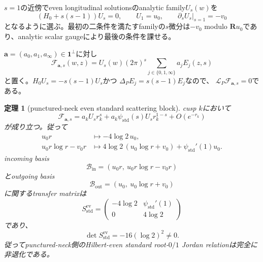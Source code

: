 \documentclass[11pt,a4paper]{ltjsarticle}
\newtheorem{theorem}{定理}[section]
\theoremstyle{definition}
\theoremstyle{remark}
\newcommand{\RR}{\mathbf R}
\newcommand{\one}{\mathbf 1}
\begin{document}
$s=1$の近傍でeven longitudinal solutionsのanalytic family$U_s(w)$を
\begin{equation}\label{eq:longitudinal-analytic-family}
 (H_0+s(s-1))U_s=0,
 \qquad
 U_1=u_0,
 \qquad
 \left.\partial_sU_s\right|_{s=1}=-v_0
\end{equation}
となるように選ぶ。最初の二条件を満たすfamilyの$s$微分は$-v_0$ modulo $\RR u_0$であり、analytic scalar gaugeにより最後の条件を課せる。

$\mathbf a=(a_0,a_1,a_\infty)\in\one^\perp$に対し
\begin{equation}\label{eq:separated-standard-family}
 \mathcal F_{\mathbf a,s}(w,z)
 =U_s(w)(2\pi)^s
  \sum_{j\in\{0,1,\infty\}}a_jE_j(z,s)
\end{equation}
と置く。$H_0U_s=-s(s-1)U_s$かつ
$\Delta_PE_j=s(s-1)E_j$なので、
$\mathscr L_P\mathcal F_{\mathbf a,s}=0$である。

\begin{theorem}[punctured-neck even standard scattering block]
\label{thm:even-standard-jordan-block}
cusp $k$において
\begin{equation}\label{eq:separated-standard-cusp-expansion}
 \mathcal F_{\mathbf a,s}
 =a_kU_s r_k^s
 +a_k\psi_{\mathrm{std}}(s)U_s r_k^{1-s}
 +O(e^{-r_k})
\end{equation}
が成り立つ。従って
\begin{align}
 u_0r&\longmapsto-4\log2\,u_0,
 \label{eq:regular-standard-transfer}\\
 u_0r\log r-v_0r
 &\longmapsto
 4\log2\,(u_0\log r+v_0)
 +\psi_{\mathrm{std}}'(1)u_0.
 \label{eq:jordan-standard-transfer}
\end{align}
incoming basis
\[
 \mathcal B_{\mathrm{in}}
 =(u_0r,\ u_0r\log r-v_0r)
\]
とoutgoing basis
\[
 \mathcal B_{\mathrm{out}}
 =(u_0,\ u_0\log r+v_0)
\]
に関するtransfer matrixは
\begin{equation}\label{eq:even-standard-transfer-matrix}
 \boxed{
 S_{\mathrm{std}}^{\mathrm{ev}}
 =\begin{pmatrix}
 -4\log2&\psi_{\mathrm{std}}'(1)\\
 0&4\log2
 \end{pmatrix}
 }
\end{equation}
であり、
\begin{equation}\label{eq:even-standard-transfer-det}
 \det S_{\mathrm{std}}^{\mathrm{ev}}
 =-16(\log2)^2\ne0.
\end{equation}
従ってpunctured-neck側のHilbert-even standard root-$0/1$ Jordan relationは完全に非退化である。
\end{theorem}
\end{document}
